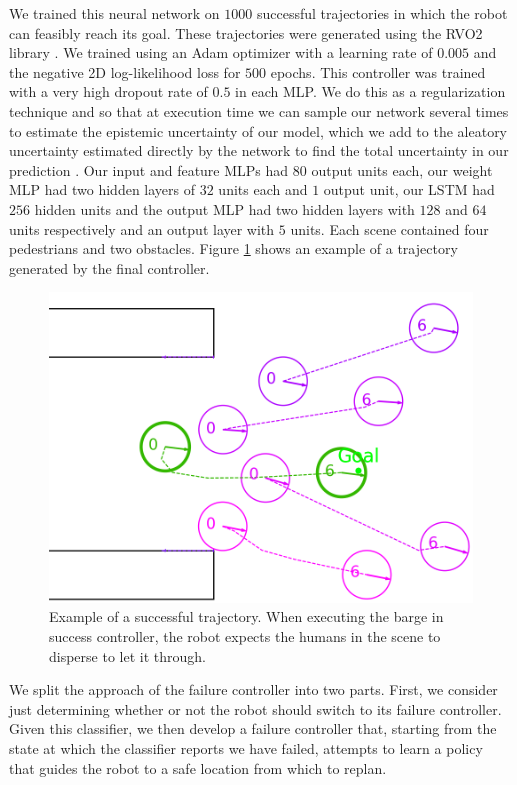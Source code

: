 \documentclass[letterpaper, 10 pt, conference]{ieeeconf}  %
\begin{document}
	We trained this neural network on $1000$ successful trajectories in which the robot can feasibly reach its goal. These trajectories were generated using the RVO2 library \cite{rvo2}\cite{pyrvo2}. We trained using an Adam optimizer with a learning rate of $0.005$ and the negative 2D log-likelihood loss for $500$ epochs. This controller was trained with a very high dropout rate of $0.5$ in each MLP. We do this as a regularization technique and so that at execution time we can sample our network several times to estimate the epistemic uncertainty of our model, which we add to the aleatory uncertainty estimated directly by the network to find the total uncertainty in our prediction \cite{gal2016uncertainty}. Our input and feature MLPs had $80$ output units each, our weight MLP had two hidden layers of $32$ units each and $1$ output unit, our LSTM had $256$ hidden units and the output MLP had two hidden layers with $128$ and $64$ units respectively and an output layer with $5$ units. Each scene contained four pedestrians and two obstacles. Figure \ref{fig:success} shows an example of a trajectory generated by the final controller. 

	\begin{figure}
		\centering
		\includegraphics[width=\linewidth]{success_without_ellipses}
		\caption{Example of a successful trajectory. When executing the barge in success controller, the robot expects the humans in the scene to disperse to let it through.}
		\label{fig:success}
	\end{figure}
	
	We split the approach of the failure controller into two parts. First, we consider just determining whether or not the robot should switch to its failure controller. Given this classifier, we then develop a failure controller that, starting from the state at which the classifier reports we have failed, attempts to learn a policy that guides the robot to a safe location from which to replan.
	
\end{document}
